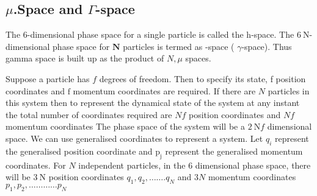 \subsection{$\mu$.Space and $\Gamma$-space}
\par The 6-dimensional phase space for a single particle is called the h-space. The $6 \mathrm{~N}$-dimensional phase space for $\mathbf{N}$ particles is termed as -space ( $\gamma$-space). Thus gamma space is built up as the product of $N, \mu$ spaces.\\
\par Suppose a particle has $f$ degrees of freedom. Then to specify its state, f position coordinates and $\mathrm{f}$ momentum coordinates are required.
If there are $N$ particles in this system then to represent the dynamical state of the system at any instant the total number of coordinates required are $N f$ position coordinates and $N f$ momentum coordinates The phase space of the system will be a $2 \mathrm{~N} f$ dimensional space. We can use generalised coordinates to represent a system. Let $q_{i}$ represent the generalised position coordinate and $\mathrm{p}_{\mathrm{j}}$ represent the generalised momentum coordinates. For $N$ independent particles, in the 6 dimensional phase space, there will be $3 \mathrm{~N}$ position coordinates
$q_{1}, q_{2}, \ldots \ldots . q_{N}$ and $3 N$ momentum coordinates $p_{1}, p_{2}, \ldots \ldots \ldots \ldots p_{N}$
